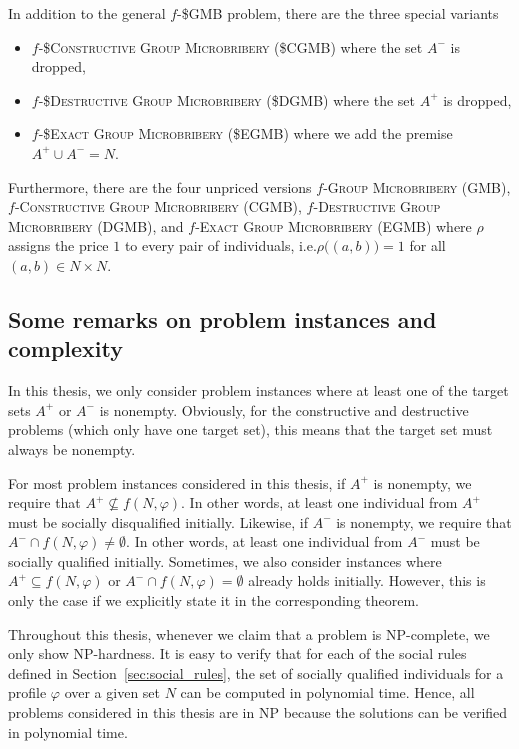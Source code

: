 \documentclass[
    12pt,               %
    a4paper,            %
    bibtotoc,           %
    pointlessnumbers,   %
    ngerman,            %
    titlepage,          %
    leqno,              %
    ]{scrarticle}       %
\newcommand\secref{Section~\ref}
\begin{document}
In addition to the general $f$-\$GMB problem, there are the three special variants
\begin{itemize}
\item
$f$-\textsc{\$Constructive Group Microbribery} (\$CGMB) where the set $A^-$ is dropped,
\item
$f$-\textsc{\$Destructive Group Microbribery} (\$DGMB) where the set $A^+$ is dropped,
\item
$f$-\textsc{\$Exact Group Microbribery} (\$EGMB) where we add the premise \\ $A^+ \cup A^- = N$.
\end{itemize}

Furthermore, there are the four unpriced versions $f$-\textsc{Group Microbribery} (GMB), $f$-\textsc{Constructive Group Microbribery} (CGMB), $f$-\textsc{Destructive Group Microbribery} (DGMB), and $f$-\textsc{Exact Group Microbribery} (EGMB) where $\rho$ assigns the price $1$ to every pair of individuals, i.e.\@ $\rho\big((a, b)\big) = 1$ for all $(a, b) \in N \times N$.



\subsection{Some remarks on problem instances and complexity}

In this thesis, we only consider problem instances where at least one of the target sets $A^+$ or $A^-$ is nonempty. Obviously, for the constructive and destructive problems (which only have one target set), this means that the target set must always be nonempty.

For most problem instances considered in this thesis, if $A^+$ is nonempty, we require that $A^+ \not\subseteq f(N, \varphi)$. In other words, at least one individual from $A^+$ must be socially disqualified initially. Likewise, if $A^-$ is nonempty, we require that $A^- \cap f(N, \varphi) \neq \emptyset$. In other words, at least one individual from $A^-$ must be socially qualified initially. Sometimes, we also consider instances where $A^+ \subseteq f(N, \varphi)$ or $A^- \cap f(N, \varphi) = \emptyset$ already holds initially. However, this is only the case if we explicitly state it in the corresponding theorem.

Throughout this thesis, whenever we claim that a problem is NP-complete, we only show NP-hardness. It is easy to verify that for each of the social rules defined in \secref{sec:social_rules}, the set of socially qualified individuals for a profile $\varphi$ over a given set $N$ can be computed in polynomial time. Hence, all problems considered in this thesis are in NP because the solutions can be verified in polynomial time.
\end{document}
